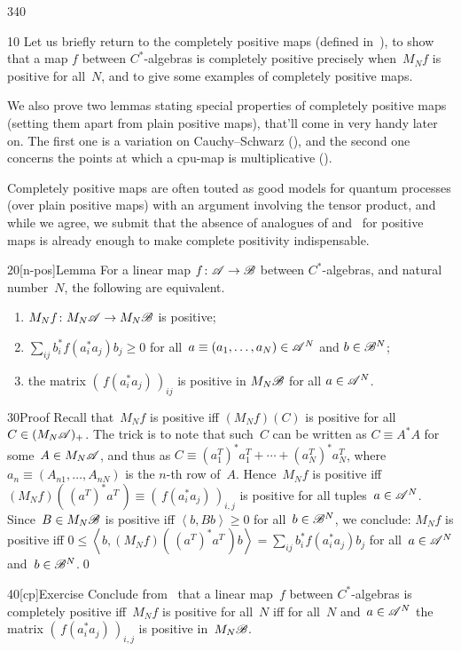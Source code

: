 \begin{parsec}{340}%
\begin{point}{10}%
Let us briefly return
to the completely positive maps (defined in~),
to show that a map $f$ between $C^*$-algebras
is completely positive precisely
when~$M_Nf$ is positive for all~$N$,
and to give some examples of completely positive maps.

We also prove two lemmas
stating special properties of completely positive maps (setting
them apart from plain positive maps),
that'll come in very handy later on.
The first one is a variation on Cauchy--Schwarz
(),
and the second one concerns
the points at which a cpu-map is multiplicative ().

Completely positive maps are often touted as 
good models for quantum processes
(over plain positive maps)
with an argument involving the tensor product,
and while we agree,
we submit that the absence of analogues of  and~
for positive maps
is already enough to make complete positivity indispensable.
\end{point}
\begin{point}{20}[n-pos]{Lemma}%
For a linear map $f\colon \mathscr{A}\to\mathscr{B}$
between $C^*$-algebras,
and natural number~$N$,
the following are equivalent.
\begin{enumerate}
\item
\label{n-pos-1}
$M_Nf\colon M_N\mathscr{A}\to M_N\mathscr{B}$
is positive;
\item
\label{n-pos-2}
	$\sum_{ij} b^*_if(a^*_ia_j)b_j \geq 0$
	for all~$a\equiv(a_1,\dotsc,a_N)\in \mathscr{A}^N$
	and $b\in \mathscr{B}^N$;
\item
\label{n-pos-3}
the matrix $(\,f(a_i^*a_j)\,)_{ij}$
is positive in $M_N\mathscr{B}$ for all $a\in\mathscr{A}^N$.
\end{enumerate}
\begin{point}{30}{Proof}%
Recall that~$M_Nf$ is positive
iff $(M_Nf)(C)$ is positive for all $C\in (M_N\mathscr{A})_{+}$.
The trick is to note that such~$C$ can be written as $C\equiv A^*A$
for some~$A\in M_N\mathscr{A}$,
and thus as $C \equiv (a_1^T)^* a_1^T+\dotsb+(a_N^T)^*a_N^T$,
where $a_n\equiv(A_{n1},\dotsc,A_{nN})$ is the $n$-th row of~$A$.
Hence~$M_Nf$ is positive
iff $(M_Nf)(\,(a^T)^*a^T\, )\equiv(\,f(a_i^*a_j)\,)_{i,j}$ is positive
for all tuples~$a\in\mathscr{A}^N$.
Since~$B\in M_N\mathscr{B}$ is positive iff $\left<b,Bb\right>\geq 0$
for all~$b\in \mathscr{B}^N$,
we conclude:
$M_Nf$ is positive iff 
$0\leq\left<b,(M_Nf)(\, (a^T)^*a^T\,) b\right>
= \sum_{ij} b_i^*f(a_i^*a_j)b_j$
for all~$a\in\mathscr{A}^N$ and~$b\in\mathscr{B}^N$.\qed
\end{point}
\end{point}
\begin{point}{40}[cp]{Exercise}%
Conclude from~
that a linear map~$f$ between $C^*$-algebras
is completely positive iff~$M_Nf$ is positive for all~$N$
iff 
for all~$N$ and~$a\in \mathscr{A}^N$
the matrix $(\,f(a_i^*a_j)\,)_{i,j}$ 
is positive in~$M_N\mathscr{B}$.


\end{point}
\end{parsec}
